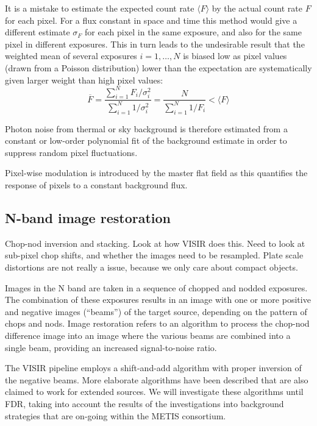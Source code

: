 It is a mistake to estimate the expected count rate $\langle F\rangle$
by the actual count rate $F$ for each pixel. For a flux constant in
space and time this method would give a different estimate
$\sigma_{F}$ for each pixel in the same exposure, and also for the same pixel
in different exposures. This in turn leads to the undesirable result
that the weighted mean of several exposures $i = 1,\dots, N$ is biased
low as pixel values (drawn from a Poisson distribution) lower than the
expectation are systematically given larger weight than high pixel
values:
\begin{equation}
  \label{eq:weighted_mean}
  \overline{F} = \frac{\sum_{i=1}^{N}
    F_{i}/\sigma_{i}^{2}}{\sum_{i=1}^{N} 1/\sigma_{i}^{2}} =
  \frac{N}{\sum_{i=1}^{N}1/F_{i}} < \langle F\rangle
\end{equation}

Photon noise from thermal or sky background is therefore estimated
from a constant or low-order polynomial fit of the background estimate
in order to suppress random pixel fluctuations.

Pixel-wise modulation is introduced by the master flat field as this
quantifies the response of pixels to a constant background flux.

\subsection{N-band image restoration}
\label{ssec:criticalnbandimagerestoration}
\label{ssec:image_restoration}


Chop-nod inversion and stacking. Look at how VISIR does this.
Need to look at sub-pixel chop shifts, and whether the images need to be resampled.
Plate scale distortions are not really a issue, because we only care about compact objects.

Images in the N band are taken in a sequence of chopped and nodded
exposures. The combination of these exposures results in an image with
one or more positive and negative images (``beams'') of the target
source, depending on the pattern of chops and nods. Image restoration
refers to an algorithm to process the chop-nod difference image into
an image where the various beams are combined into a single beam,
providing an increased signal-to-noise ratio.

The VISIR pipeline employs a shift-and-add algorithm with proper
inversion of the negative beams. More elaborate algorithms have been
described that are also claimed to work for extended sources. We will
investigate these algorithms until FDR, taking into account the
results of the investigations into background strategies that are
on-going within the METIS consortium.

